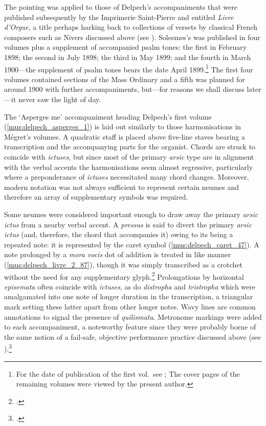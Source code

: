 The pointing was applied to those of Delpech's accompaniments that were published subsequently by the Imprimerie Saint-Pierre and entitled \emph{Livre d'Orgue}, a title perhaps harking back to collections of versets by classical French composers such as Nivers discussed above (see ).
Solesmes's \ldo{} was published in four volumes plus a supplement of accompanied psalm tones: the first in February 1898; the second in July 1898; the third in May 1899; and the fourth in March 1900---the supplement of psalm tones bears the date April 1899.\footnote{For the date of publication of the first vol.\ see \cite[416, n.~35]{HalaSolesmesmusiciensSchola2017}; The cover pages of the remaining volumes were viewed by the present author.}
The first four volumes contained sections of the Mass Ordinary and a fifth was planned for around 1900 with further accompaniments, but---for reasons we shall discuss later---it never saw the light of day.

The `Asperges me' accompaniment heading Delpech's first volume (\cref{mus:delpech_asperges_1}) is laid out similarly to those harmonisations in Mégret's volumes.
A quadratic staff is placed above five-line staves bearing a transcription and the accompanying parts for the organist.
Chords are struck to coincide with \emph{ictuses}, but since most of the primary \emph{arsic} type are in alignment with the verbal accents the harmonisations seem almost regressive, particularly where a preponderance of \emph{ictuses} necessitated many chord changes.
Moreover, modern notation was not always sufficient to represent certain neumes and therefore an array of supplementary symbols was required.

%
Some neumes were considered important enough to draw away the primary \emph{arsic} \emph{ictus} from a nearby verbal accent.
A \emph{pressus} is said to divert the primary \emph{arsic} \emph{ictus} (and, therefore, the chord that accompanies it) owing to its being a repeated note: it is represented by the caret symbol (\cref{mus:delpech_caret_47}).
A note prolonged by a \emph{mora vocis} dot of addition is treated in like manner (\cref{mus:delpech_livre_2_87}), though it was simply transcribed as a crotchet without the need for any supplementary glyph.\footcite[1, 34, 47, 87]{LivreOrgueChants1898}
Prolongations by horizontal \emph{episemata} often coincide with \emph{ictuses}, as do \emph{distropha} and \emph{tristropha} which were amalgamated into one note of longer duration in the transcription, a triangular mark setting these latter apart from other longer notes.
Wavy lines are common annotations to signal the presence of \emph{quilismata}.
Metronome markings were \mbox{added} to each accompaniment, a noteworthy feature since they were probably borne of the same notion of a fail-safe, objective performance practice discussed above (see ).\footnote{\cite[The annotations are also described in][64--5]{EllisPoliticsPlainchantfindesiecle2013}.\label{fn:ellis_annotations}}
%


